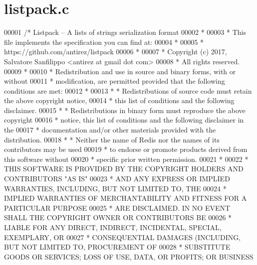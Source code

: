 \hypertarget{listpack_8c_source}{}\section{listpack.\+c}
\label{listpack_8c_source}

\begin{DoxyCode}
00001 \textcolor{comment}{/* Listpack -- A lists of strings serialization format}
00002 \textcolor{comment}{ *}
00003 \textcolor{comment}{ * This file implements the specification you can find at:}
00004 \textcolor{comment}{ *}
00005 \textcolor{comment}{ *  https://github.com/antirez/listpack}
00006 \textcolor{comment}{ *}
00007 \textcolor{comment}{ * Copyright (c) 2017, Salvatore Sanfilippo <antirez at gmail dot com>}
00008 \textcolor{comment}{ * All rights reserved.}
00009 \textcolor{comment}{ *}
00010 \textcolor{comment}{ * Redistribution and use in source and binary forms, with or without}
00011 \textcolor{comment}{ * modification, are permitted provided that the following conditions are met:}
00012 \textcolor{comment}{ *}
00013 \textcolor{comment}{ *   * Redistributions of source code must retain the above copyright notice,}
00014 \textcolor{comment}{ *     this list of conditions and the following disclaimer.}
00015 \textcolor{comment}{ *   * Redistributions in binary form must reproduce the above copyright}
00016 \textcolor{comment}{ *     notice, this list of conditions and the following disclaimer in the}
00017 \textcolor{comment}{ *     documentation and/or other materials provided with the distribution.}
00018 \textcolor{comment}{ *   * Neither the name of Redis nor the names of its contributors may be used}
00019 \textcolor{comment}{ *     to endorse or promote products derived from this software without}
00020 \textcolor{comment}{ *     specific prior written permission.}
00021 \textcolor{comment}{ *}
00022 \textcolor{comment}{ * THIS SOFTWARE IS PROVIDED BY THE COPYRIGHT HOLDERS AND CONTRIBUTORS "AS IS"}
00023 \textcolor{comment}{ * AND ANY EXPRESS OR IMPLIED WARRANTIES, INCLUDING, BUT NOT LIMITED TO, THE}
00024 \textcolor{comment}{ * IMPLIED WARRANTIES OF MERCHANTABILITY AND FITNESS FOR A PARTICULAR PURPOSE}
00025 \textcolor{comment}{ * ARE DISCLAIMED. IN NO EVENT SHALL THE COPYRIGHT OWNER OR CONTRIBUTORS BE}
00026 \textcolor{comment}{ * LIABLE FOR ANY DIRECT, INDIRECT, INCIDENTAL, SPECIAL, EXEMPLARY, OR}
00027 \textcolor{comment}{ * CONSEQUENTIAL DAMAGES (INCLUDING, BUT NOT LIMITED TO, PROCUREMENT OF}
00028 \textcolor{comment}{ * SUBSTITUTE GOODS OR SERVICES; LOSS OF USE, DATA, OR PROFITS; OR BUSINESS}

\end{DoxyCode}
